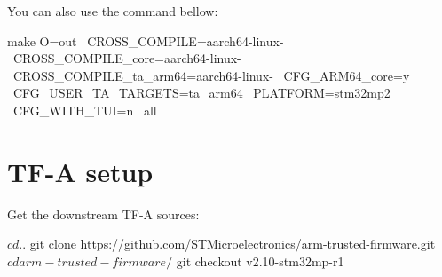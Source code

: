 You can also use the command bellow:
\begin{bashinput}
  make O=out \
  CROSS_COMPILE=aarch64-linux- \
  CROSS_COMPILE_core=aarch64-linux- \
  CROSS_COMPILE_ta_arm64=aarch64-linux- \
  CFG_ARM64_core=y \
  CFG_USER_TA_TARGETS=ta_arm64 \
  PLATFORM=stm32mp2 \
  CFG_WITH_TUI=n \
  all
\end{bashinput}

\section{TF-A setup}

Get the downstream TF-A sources:

\begin{bashinput}
$ cd ..
$ git clone https://github.com/STMicroelectronics/arm-trusted-firmware.git
$ cd arm-trusted-firmware/
$ git checkout v2.10-stm32mp-r1
\end{bashinput}

